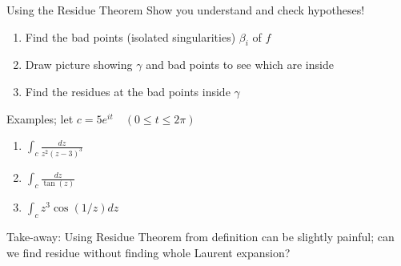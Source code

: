 \documentclass{beamer}
\begin{document}
\begin{frame}{Using the Residue Theorem}
Show you understand and \alert{check hypotheses}!

\begin{enumerate}
    \item Find the bad points (isolated singularities) $\beta_i$ of $f$ 
    \item Draw picture showing $\gamma$ and bad points to see which are inside
    \item Find the residues at the bad points inside $\gamma$
\end{enumerate}
\begin{block}{Examples; let  $c=5e^{it}\quad (0\leq t\leq 2\pi)$}
\begin{enumerate}
\item $\int_c\frac{dz}{z^2(z-3)^3}$
\item $\int_c \frac{dz}{\tan(z)}$
\item $\int_c z^3\cos(1/z)dz$
\end{enumerate}
\end{block}
\begin{block}{Take-away:}
Using Residue Theorem from definition can be slightly painful; can we find residue without finding whole Laurent expansion?
\end{block}


\end{frame}
\end{document}
